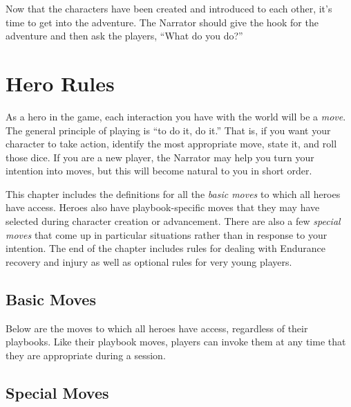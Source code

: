 \documentclass[letterpaper]{report}
\begin{document}
Now that the characters have been created and introduced to each other,
it's time to get into the adventure.
The Narrator should give the hook for the adventure and then ask the
players, ``What do you do?''


\chapter{Hero Rules}

As a hero in the game, each interaction you have with the world
will be a \emph{move}. The general principle of playing \kapow{} is
``to do it, do it.''
That is, if you want your character to take action, identify the
most appropriate move, state it, and roll those dice.
If you are a new player, the Narrator may help you turn your
intention into moves, but this will become natural to you
in short order.

This chapter includes the definitions for all the \emph{basic moves}
to which all heroes have access. Heroes also have playbook-specific
moves that they may have selected during character creation or
advancement.  There are also a few \emph{special moves} that come up
in particular situations rather than in response to your intention.
The end of the chapter includes rules for dealing with
Endurance recovery and injury as well as optional rules for very young
players.

\renewenvironment{movedef}[\movedefarity]
{\subsection*{#1}
  \begin{adjustwidth}{0.25in}{0.25in}
    {\itshape #2}\vspace{0.2cm}
  \end{adjustwidth}

  #3}
{}

\section{Basic Moves}
\label{sec:basic-moves}

Below are the moves to which all heroes have access, regardless
of their playbooks. Like their playbook moves, players can invoke
them at any time that they are appropriate during a session.



\section{Special Moves}
\end{document}
